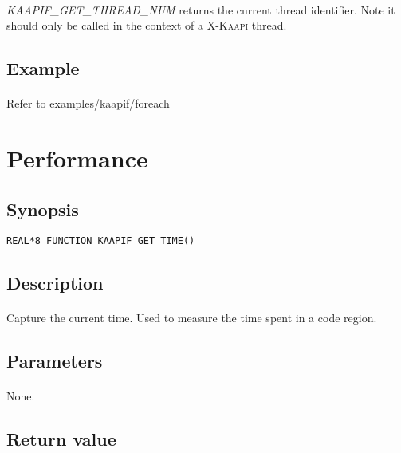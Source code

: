 \documentclass[a4paper, 11pt]{article}
\newcommand{\kaapi}{\textsc{X-Kaapi}\xspace}
\begin{document}
\paragraph{}
\textit{KAAPIF\_GET\_THREAD\_NUM} returns the current thread identifier. Note it
should only be called in the context of a \kaapi thread.

\subsection{Example}
\paragraph{}
Refer to examples/kaapif/foreach


\newpage
\section{Performance}

\subsection{Synopsis}
\begin{small}
\lstset{language=C}
\begin{lstlisting}[frame=tb]
REAL*8 FUNCTION KAAPIF_GET_TIME()
\end{lstlisting}
\end{small}

\subsection{Description}
\paragraph{}
Capture the current time. Used to measure the time spent in a code region.

\subsection{Parameters}
\paragraph{}
None.

\subsection{Return value}
\end{document}
